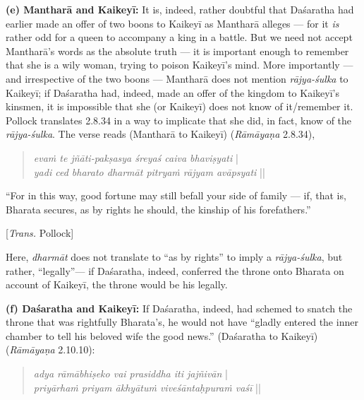 \noindent
\textbf{(e) Mantharā and Kaikeyī:} It is, indeed, rather doubtful that Daśaratha had earlier made an offer of two boons to Kaikeyī as Mantharā alleges --- for it {\sl is} rather odd for a queen to accompany a king in a battle. But we need not accept Mantharā’s words as the absolute truth --- it is important enough to remember that she is a wily woman, trying to poison Kaikeyī’s mind.  More importantly --- and irrespective of the two boons --- Mantharā does not mention {\sl rājya-śulka} to Kaikeyī; if Daśaratha had, indeed, made an offer of the kingdom to Kaikeyī’s kinsmen, it is impossible that she (or Kaikeyī) does not know of it/remember it. Pollock translates 2.8.34 in a way to implicate that she did, in fact, know of the {\sl rājya-śulka}. The verse reads (Mantharā to Kaikeyī) ({\sl Rāmāyaṇa} 2.8.34), 
\begin{quote}
{{\sl evaṁ te jñāti-pakṣasya śreyaś caiva bhaviṣyati}}\label{verse14} |\\
{\sl yadi ced bharato dharmāt pitryaṁ rājyam avāpsyati} || 
\end{quote}

\begin{myquote}
 “For in this way, good fortune may still befall your side of family --- if, that is, Bharata secures, as by rights he should, the kinship of his forefathers.” 

\hfill [{\sl Trans.} Pollock]
\end{myquote}

Here, {\sl dharmāt} does not translate to “as by rights” to imply a {\sl rājya-śulka}, but rather, “legally”--- if Daśaratha, indeed, conferred the throne onto Bharata on account of Kaikeyī, the throne would be his legally. 

\smallskip
\noindent
\textbf{(f) Daśaratha and Kaikeyī:} If Daśaratha, indeed, had schemed to snatch the throne that was rightfully Bharata’s, he would not have “gladly entered the inner chamber to tell his beloved wife the good news.” (Daśaratha to Kaikeyī) ({\sl Rāmāyaṇa} 2.10.10):
\begin{quote}
{{\sl adya rāmābhiṣeko vai prasiddha iti jajñivān}}\label{verse15} |\\
{\sl priyārhaṁ priyam ākhyātuṁ viveśāntaḥpuraṁ vaśī} || 
\end{quote}

